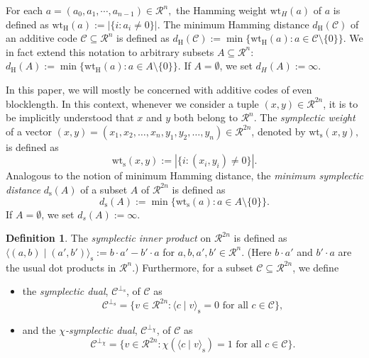 \documentclass{article}
\theoremstyle{remark}
\theoremstyle{definition}
\newtheorem{defin}{Definition}[section]
\numberwithin{equation}{section}
\begin{document}
For each $a=(a_0,a_1,\cdots,a_{n-1}) \in \mathcal{R}^n,$ the Hamming weight $\text{wt}_{H}(a)$ of $a$ is defined as $\text{wt}_{\mathrm{H}}(a):=|\{ i : a_i \neq 0\}|.$ The minimum Hamming distance $d_{\mathrm{H}}(\mathcal{C})$ of an additive code $\mathcal{C} \subseteq \mathcal{R}^{n}$ is defined as $d_{\mathrm{H}}(\mathcal{C}):=\min\{\text{wt}_{\text{H}}(a) :a \in \mathcal{C} \setminus \{0\}\}$. We in fact extend this notation to arbitrary subsets $A \subseteq \mathcal{R}^n$: $d_{\mathrm{H}}(A):=\min\{\text{wt}_{\text{H}}(a) :a \in A\setminus \{0\}\}$. If $A = \emptyset$, we set $d_H(A) := \infty$.
 
In this paper, we will mostly be concerned with additive codes of even blocklength. In this context, whenever we consider a tuple $(x,y) \in \mathcal{R}^{2n}$, it is to be implicitly understood that $x$ and $y$ both belong to $\mathcal{R}^n$. The \emph{symplectic weight} of a vector $(x,y)=(x_1,x_2,\ldots,x_n,y_1,y_2,\ldots,y_n) \in \mathcal{R}^{2n}$, denoted by $\text{wt}_{\mathrm{s}}(x,y),$ is defined as $$\text{wt}_{\mathrm{s}}(x,y):=|\{ i : (x_i,y_i) \neq 0\}|.$$ Analogous to the notion of minimum Hamming distance, the \emph{minimum symplectic distance} $d_{\mathrm{s}}(A)$ of a subset $A$ of $\mathcal{R}^{2n}$ is defined as  
 $$d_{\mathrm{s}}(A):=\min\{\text{wt}_{\mathrm{s}}(a) :a \in A\setminus \{0\}\}.$$
If $A = \emptyset$, we set $d_s(A) := \infty$. 

\begin{defin} \label{def:sip} The \emph{symplectic inner product} on $\mathcal{R}^{2n}$ is defined as $\langle (a,b) \mid (a',b')\rangle_{\mathrm{s}} := b \cdot a'-b' \cdot a$  for $a,b,a',b' \in \mathcal{R}^n.$ (Here $b \cdot a'$ and $b' \cdot a$ are the usual dot products in $\mathcal{R}^n.$) Furthermore, for a subset $\mathcal{C} \subseteq \mathcal{R}^{2n}$, we define
\begin{itemize}
\item the \emph{symplectic dual}, $\mathcal{C}^{\perp_\mathrm{s}}$, of $\mathcal{C}$ as
$$\mathcal{C}^{\perp_{\mathrm{s}}}=\{v \in \mathcal{R}^{2n} :  \langle c \mid v\rangle_{\mathrm{s}} = 0 \text{~for all~} c \in \mathcal{C}\},$$
\item and the \emph{$\chi$-symplectic dual}, $\mathcal{C}^{\perp_\chi}$, of $\mathcal{C}$ as $$\mathcal{C}^{\perp_\chi}=\{v \in \mathcal{R}^{2n} : \chi(\langle c \mid  v\rangle_{\mathrm{s}}) = 1 \text{~for all~} c \in \mathcal{C}\}.$$
\end{itemize}
\end{defin}
\end{document}

